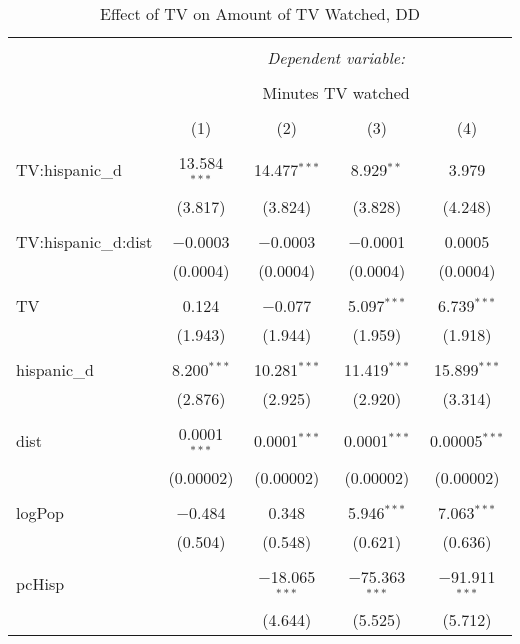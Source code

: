
\begin{table}[!htbp] \centering 
  \caption{Effect of TV on Amount of TV Watched, DD} 
  \label{} 
\begin{tabular}{@{\extracolsep{-5pt}}lcccc} 
\\[-1.8ex]\hline 
\hline \\[-1.8ex] 
 & \multicolumn{4}{c}{\textit{Dependent variable:}} \\ 
\cline{2-5} 
\\[-1.8ex] & \multicolumn{4}{c}{Minutes TV watched} \\ 
\\[-1.8ex] & (1) & (2) & (3) & (4)\\ 
\hline \\[-1.8ex] 
 TV:hispanic\_d & 13.584$^{***}$ & 14.477$^{***}$ & 8.929$^{**}$ & 3.979 \\ 
  & (3.817) & (3.824) & (3.828) & (4.248) \\ 
  & & & & \\ 
 TV:hispanic\_d:dist & $-$0.0003 & $-$0.0003 & $-$0.0001 & 0.0005 \\ 
  & (0.0004) & (0.0004) & (0.0004) & (0.0004) \\ 
  & & & & \\ 
 TV & 0.124 & $-$0.077 & 5.097$^{***}$ & 6.739$^{***}$ \\ 
  & (1.943) & (1.944) & (1.959) & (1.918) \\ 
  & & & & \\ 
 hispanic\_d & 8.200$^{***}$ & 10.281$^{***}$ & 11.419$^{***}$ & 15.899$^{***}$ \\ 
  & (2.876) & (2.925) & (2.920) & (3.314) \\ 
  & & & & \\ 
 dist & 0.0001$^{***}$ & 0.0001$^{***}$ & 0.0001$^{***}$ & 0.00005$^{***}$ \\ 
  & (0.00002) & (0.00002) & (0.00002) & (0.00002) \\ 
  & & & & \\ 
 logPop & $-$0.484 & 0.348 & 5.946$^{***}$ & 7.063$^{***}$ \\ 
  & (0.504) & (0.548) & (0.621) & (0.636) \\ 
  & & & & \\ 
 pcHisp &  & $-$18.065$^{***}$ & $-$75.363$^{***}$ & $-$91.911$^{***}$ \\ 
  &  & (4.644) & (5.525) & (5.712) \\ 

\end{tabular}
\end{table}
